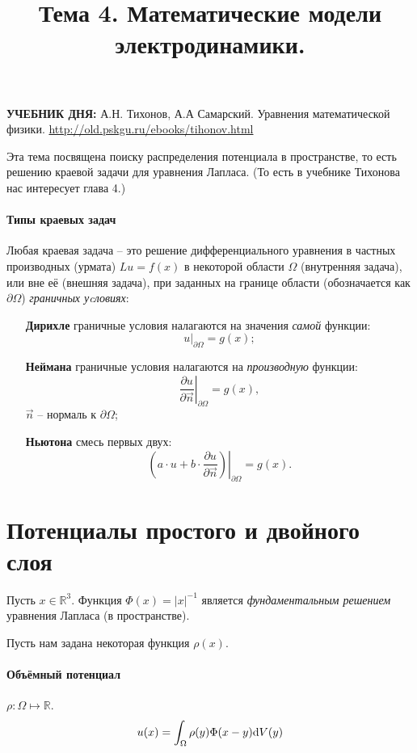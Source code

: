 \documentclass[12pt]{report}
\title{Тема 4. Математические модели электродинамики.}
\begin{document}
	\maketitle

\begin{tcolorbox}
	\textbf{УЧЕБНИК ДНЯ:}
	А.Н. Тихонов, А.А Самарский. Уравнения математической физики.
	\url{http://old.pskgu.ru/ebooks/tihonov.html}
\end{tcolorbox}

Эта тема посвящена поиску распределения потенциала в пространстве, то есть решению краевой задачи для уравнения Лапласа. (То есть в учебнике Тихонова нас интересует глава 4.)

\paragraph{Типы краевых задач}
Любая краевая задача -- это решение дифференциального уравнения в частных производных (урмата) $Lu = f(x)$ в некоторой области $\Omega$ (внутренняя задача), или вне её (внешняя задача), при заданных на границе области (обозначается как $\partial\Omega$) \emph{граничных уcловиях}:
\begin{enumerate}[(1)]
	\item[\textbf{Дирихле}] граничные условия налагаются на значения \emph{самой} функции: 
	\[
		u\vert_{\partial\Omega}=g(x);
	\]
	\item[\textbf{Неймана}] граничные условия налагаются на \emph{производную} функции: 
	\[
		\left.\frac{\partial u}{\partial\vec n}\right\vert_{\partial\Omega} = g(x),
	\]
	$\vec n$ -- нормаль к $\partial\Omega$;
	\item[\textbf{Ньютона}] смесь первых двух: 
	\[
		\left.\left(a\cdot u + b\cdot \frac{\partial u}{\partial\vec n}\right)\right\vert_{\partial\Omega} = g(x).
	\]
\end{enumerate}

\section{Потенциалы простого и двойного слоя}
Пусть $x\in\mathbb{R}^3$.
Функция $\Phi(x) = |x|^{-1}$ является \emph{фундаментальным решением} уравнения Лапласа (в пространстве).~\cite[стр.~282]{Tikhonov}

Пусть нам задана некоторая функция $\rho(x)$.
\paragraph{Объёмный потенциал}
$\rho: \Omega \mapsto \mathbb{R}$.
\begin{equation}
	u(x) = \int_\Omega \rho(y)\Phi(x-y)\mathrm d V(y)
\end{equation}
\end{document}
